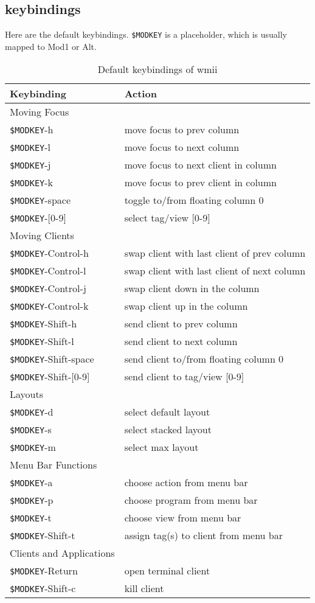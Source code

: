 \documentclass[12pt,a4paper]{article} %
\begin{document}
\subsection{keybindings}
Here are the default keybindings. \verb+$MODKEY+ is a placeholder, which is
usually mapped to Mod1 or Alt.
\begin{table}[h]
\begin{tabular}{|l|l|}
\hline %
Keybinding &Action \\ %
\hline 
\hline 
Moving Focus&\\
\verb+$MODKEY+-h&move focus to prev column \\
\verb+$MODKEY+-l&move focus to next column \\
\verb+$MODKEY+-j&move focus to next client in column \\
\verb+$MODKEY+-k&move focus to prev client in column \\
\verb+$MODKEY+-space&toggle to/from floating column 0 \\
\verb+$MODKEY+-[0-9]&select tag/view [0-9] \\
Moving Clients&\\
\verb+$MODKEY+-Control-h&swap client with last client of prev column \\
\verb+$MODKEY+-Control-l&swap client with last client of next column \\
\verb+$MODKEY+-Control-j&swap client down in the column \\
\verb+$MODKEY+-Control-k&swap client up in the column \\
\verb+$MODKEY+-Shift-h&send client to prev column \\
\verb+$MODKEY+-Shift-l&send client to next column \\
\verb+$MODKEY+-Shift-space&send client to/from floating column 0 \\
\verb+$MODKEY+-Shift-[0-9]&send client to tag/view [0-9] \\
Layouts&\\
\verb+$MODKEY+-d&select default layout \\
\verb+$MODKEY+-s&select stacked layout \\
\verb+$MODKEY+-m&select max layout \\
Menu Bar Functions&\\
\verb+$MODKEY+-a&choose action from menu bar \\
\verb+$MODKEY+-p&choose program from menu bar \\
\verb+$MODKEY+-t&choose view from menu bar \\
\verb+$MODKEY+-Shift-t&assign tag(s)  to client from menu bar \\
Clients and Applications&\\
\verb+$MODKEY+-Return&open terminal client \\
\verb+$MODKEY+-Shift-c&kill client \\
\hline 
\end{tabular} 
\caption{Default keybindings of wmii} 
\end{table}
\end{document}
